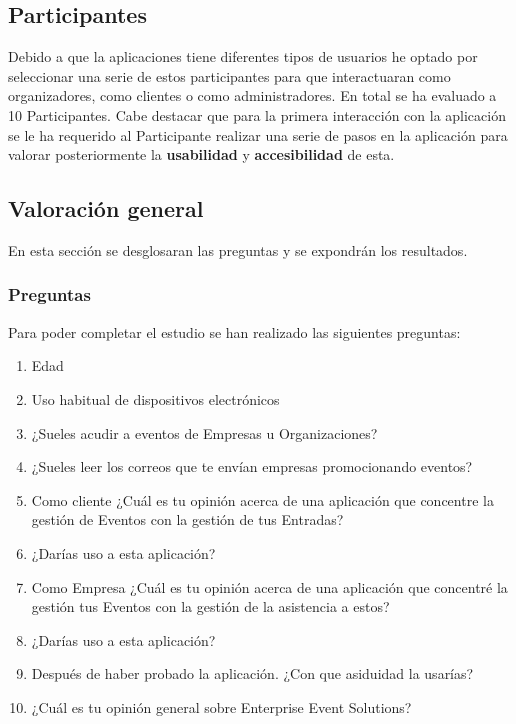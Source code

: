 \subsection{Participantes}
Debido a que la aplicaciones tiene diferentes tipos de usuarios he optado por seleccionar una serie de estos participantes para que interactuaran como organizadores,
como clientes o como administradores. En total se ha evaluado a 10 Participantes.
Cabe destacar que para la primera interacción con la aplicación se le ha requerido al Participante realizar una serie de pasos en la aplicación para 
valorar posteriormente la \textbf{usabilidad} y \textbf{accesibilidad} de esta.

\subsection{Valoración general}
En esta sección se desglosaran las preguntas y se expondrán los resultados.
\subsubsection*{Preguntas}
Para poder completar el estudio se han realizado las siguientes preguntas:
\begin{enumerate}
    \item Edad
    \item Uso habitual de dispositivos electrónicos
    \item ¿Sueles acudir a eventos de Empresas u Organizaciones?
    \item ¿Sueles leer los correos que te envían empresas promocionando eventos? 
    \item Como cliente ¿Cuál es tu opinión acerca de una aplicación que concentre la gestión de Eventos con la gestión de tus Entradas?
    \item ¿Darías uso a esta aplicación?
    \item Como Empresa ¿Cuál es tu opinión acerca de una aplicación que concentré la gestión tus Eventos con la gestión de la asistencia a estos?
    \item ¿Darías uso a esta aplicación?
    \item Después de haber probado la aplicación. ¿Con que asiduidad la usarías?
    \item ¿Cuál es tu opinión general sobre Enterprise Event Solutions?
\end{enumerate}
